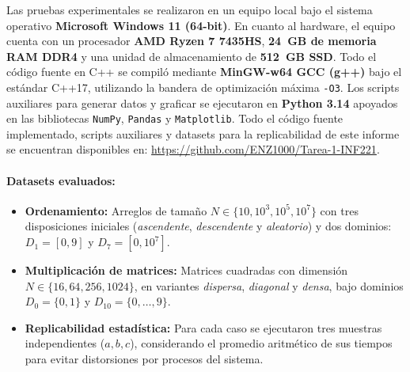 Las pruebas experimentales se realizaron en un equipo local bajo el sistema operativo \textbf{Microsoft Windows 11 (64-bit)}. En cuanto al hardware, el equipo cuenta con un procesador \textbf{AMD Ryzen 7 7435HS}, \textbf{24~GB de memoria RAM DDR4} y una unidad de almacenamiento de \textbf{512~GB SSD}. Todo el código fuente en C++ se compiló mediante \textbf{MinGW-w64 GCC (g++)} bajo el estándar C++17, utilizando la bandera de optimización máxima \texttt{-O3}. Los scripts auxiliares para generar datos y graficar se ejecutaron en \textbf{Python 3.14} apoyados en las bibliotecas \texttt{NumPy}, \texttt{Pandas} y \texttt{Matplotlib}. Todo el código fuente implementado, scripts auxiliares y datasets para la replicabilidad de este informe se encuentran disponibles en: \url{https://github.com/ENZ1000/Tarea-1-INF221}.

\paragraph{Datasets evaluados:}
\begin{itemize}[leftmargin=1.5em, itemsep=1pt]
    \item \textbf{Ordenamiento:} Arreglos de tamaño $N \in \{10, 10^3, 10^5, 10^7\}$ con tres disposiciones iniciales (\textit{ascendente}, \textit{descendente} y \textit{aleatorio}) y dos dominios: $D_1 = [0, 9]$ y $D_7 = [0, 10^7]$.
    \item \textbf{Multiplicación de matrices:} Matrices cuadradas con dimensión $N \in \{16, 64, 256, 1024\}$, en variantes \textit{dispersa}, \textit{diagonal} y \textit{densa}, bajo dominios $D_0 = \{0, 1\}$ y $D_{10} = \{0, \dots, 9\}$.
    \item \textbf{Replicabilidad estadística:} Para cada caso se ejecutaron tres muestras independientes ($a, b, c$), considerando el promedio aritmético de sus tiempos para evitar distorsiones por procesos del sistema.
\end{itemize}